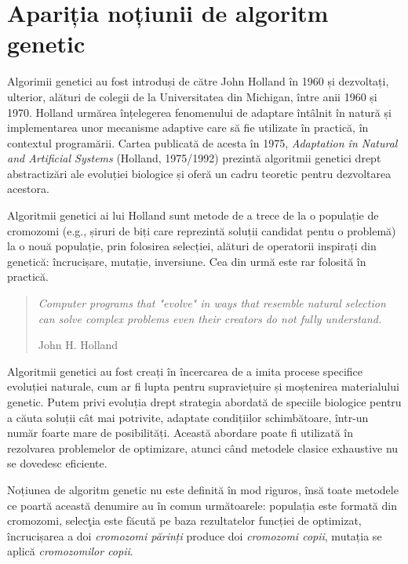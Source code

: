 \section{Apariția noțiunii de algoritm genetic} 
 
Algorimii genetici \cite{article_by_melanie_mitchell} au fost introduși de către John Holland în 1960 și dezvoltați, ulterior, alături de colegii de la Universitatea din Michigan, între anii 1960 și 1970. Holland urmărea înțelegerea fenomenului de adaptare întâlnit în natură și implementarea unor mecanisme adaptive care să fie utilizate în practică, în contextul programării. Cartea publicată de acesta în 1975, \textit{Adaptation în Natural and Artificial Systems} (Holland, 1975/1992) prezintă algoritmii genetici drept abstractizări ale evoluției biologice și oferă un cadru teoretic pentru dezvoltarea acestora.

Algoritmii genetici ai lui Holland sunt metode de a trece de la o populație de cromozomi (e.g., șiruri de biți care reprezintă soluții candidat pentu o problemă) la o nouă populație, prin folosirea selecției, alături de operatorii inspirați din genetică: încrucișare, mutație, inversiune. Cea din urmă este rar folosită în practică.

\begin{quote} 
	\textit{Computer programs that "evolve" in ways that resemble natural selection can solve complex problems even their creators do not fully understand.}
	\begin{flushright}
		John H. Holland 
	\end{flushright}
\end{quote}

\clearpage

Algoritmii genetici au fost creați în încercarea de a imita procese specifice evoluției naturale, cum ar fi lupta pentru supraviețuire și moștenirea materialului genetic. Putem privi evoluția drept strategia abordată de speciile biologice pentru a căuta soluții cât mai potrivite, adaptate condițiilor schimbătoare, într-un număr foarte mare de posibilități. Această abordare poate fi utilizată în rezolvarea problemelor de optimizare, atunci când metodele clasice exhaustive nu se dovedesc eficiente. 
 
Noțiunea de algoritm genetic nu este definită în mod riguros\cite{introduction_by_melanie_mitchell}, însă toate metodele ce poartă această denumire au în comun următoarele: populația este formată din cromozomi, selecţia este făcută pe baza rezultatelor funcției de optimizat, încrucișarea a doi \textit{cromozomi părinți} produce doi \textit{cromozomi copii}, mutația se aplică \textit{cromozomilor copii}. 

